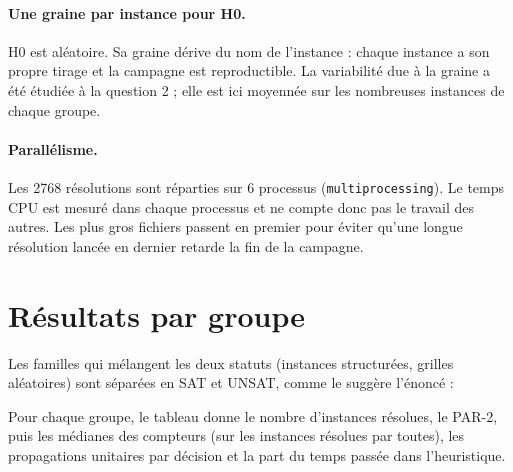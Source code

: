 \documentclass[11pt,a4paper]{article}
\begin{document}
\paragraph{Une graine par instance pour H0.} H0 est aléatoire. Sa graine
dérive du nom de l'instance : chaque instance a son propre tirage et la
campagne est reproductible. La variabilité due à la graine a été étudiée à
la question 2 ; elle est ici moyennée sur les nombreuses instances de
chaque groupe.

\paragraph{Parallélisme.} Les 2768 résolutions sont réparties sur 6
processus (\texttt{multiprocessing}). Le temps CPU est mesuré dans chaque
processus et ne compte donc pas le travail des autres. Les plus gros
fichiers passent en premier pour éviter qu'une longue résolution lancée
en dernier retarde la fin de la campagne.

\section{Résultats par groupe}

Les familles qui mélangent les deux statuts (instances structurées,
grilles aléatoires) sont séparées en SAT et UNSAT, comme le suggère
l'énoncé :
\begin{center}

\end{center}

Pour chaque groupe, le tableau donne le nombre d'instances résolues, le
PAR-2, puis les médianes des compteurs (sur les instances résolues par
toutes), les propagations unitaires par décision et la part du temps
passée dans l'heuristique.

\newcommand{\detail}[2]{%
  \begin{table}[htbp]\centering\small
  
  \caption{#2}\end{table}}

\detail{uf}{3-SAT aléatoire SAT (uf50, uf75).}
\detail{uuf}{3-SAT aléatoire UNSAT (uuf50, uuf75).}
\detail{struct-sat}{Instances structurées SAT.}
\detail{struct-unsat}{Instances structurées UNSAT. Le PAR-2 est dominé par
  public-03, qu'aucune heuristique ne résout.}
\detail{meow}{Grilles Meowdoku de la question 1 (SAT).}
\detail{meowr-sat}{Grilles Meowdoku à régions aléatoires, SAT.}
\detail{meowr-unsat}{Grilles Meowdoku à régions aléatoires, UNSAT.}
\end{document}
